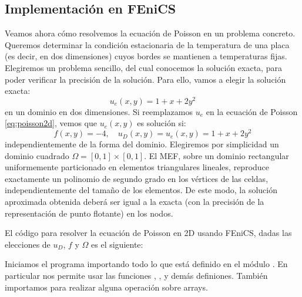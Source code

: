 \subsection{Implementación en FEniCS}
Veamos ahora cómo resolvemos la ecuación de Poisson en un problema concreto. Queremos determinar la condición estacionaria de la temperatura de una placa (es decir, en dos dimensiones) cuyos bordes se mantienen a temperaturas fijas. Elegiremos un problema sencillo, del cual conocemos la solución exacta, para poder verificar la precisión de la solución. Para ello, vamos a elegir la solución exacta:
\begin{equation}\label{eq:femex}
 u_e(x,y) = 1 + x + 2 y^2
\end{equation} 
en un dominio en dos dimensiones. Si reemplazamos $u_e$ en la ecuación de Poisson \eqref{eq:poisson2d}, vemos que $u_e(x,y)$ es solución si:
\begin{equation}
 f(x, y) = -4, \quad u_D(x, y) = u_e(x, y) = 1 + x + 2 y^2
\end{equation} 
independientemente de la forma del dominio. Elegiremos por simplicidad un dominio cuadrado $\Omega = [0, 1] \times [0, 1]$. El MEF, sobre un dominio rectangular uniformemente particionado en elementos triangulares lineales, reproduce exactamente un polinomio de segundo grado en los vértices de las celdas, independientemente del tamaño de los elementos. De este modo, la solución aproximada obtenida deberá ser igual a la exacta (con la precisión de la representación de punto flotante) en los nodos.

El código para resolver la ecuación de Poisson en 2D usando FEniCS, dadas las elecciones de $u_D$, $f$ y $\Omega$ es el siguiente:


Iniciamos el programa importando todo lo que está definido en el módulo . En particular nos permite usar las funciones , ,  y demás definiones. También importamos  para realizar alguna operación sobre arrays.

